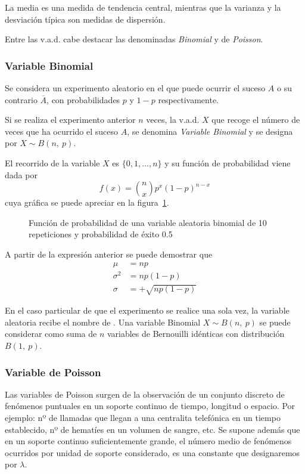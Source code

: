 La media es una medida de tendencia central, mientras que la varianza y la desviación típica son medidas de dispersión.

Entre las v.a.d. cabe destacar las denominadas \emph{Binomial} y de \emph{Poisson}.


\subsubsection{Variable Binomial}

Se considera un experimento aleatorio en el que puede ocurrir el suceso $A$ o su contrario $\overline{A}$, con
probabilidades $p$ y $1-p$ respectivamente.

Si se realiza el experimento anterior $n$ veces, la v.a.d. $X$ que recoge el número de veces que ha ocurrido el suceso
$A$, se denomina \emph{Variable Binomial} y se designa por $X\sim B(n,\ p)$.

El recorrido de la variable $X$ es $\{0,1,...,n\}$ y su función de probabilidad viene dada por 
\[
f(x)= \binom{n}{x} p^x \left( {1 - p} \right)^{n - x} 
\] 
cuya gráfica se puede apreciar en la figura~\ref{g:binomial}.

\begin{figure}[h!]
\centering
\scalebox{0.8}{} 
\caption{Función de probabilidad de una variable aleatoria binomial de 10 repeticiones y probabilidad de éxito 0.5}\label{g:binomial}
\end{figure}

A partir de la expresión anterior se puede demostrar que
\begin{align*}
\mu  &= n p\\
\sigma ^2  &= n p (1 - p)\\
\sigma  &=  + \sqrt {n p (1 - p)}
\end{align*}

En el caso particular de que el experimento se realice una sola vez, la variable aleatoria recibe el nombre de
.
Una variable Binomial $X\sim B(n,\ p)$ se puede considerar como suma de $n$ variables de Bernouilli idénticas con
distribución $B(1,\ p)$.


\subsubsection{Variable de Poisson}
Las variables de Poisson surgen de la observación de un conjunto discreto de fenómenos puntuales en un soporte continuo
de tiempo, longitud o espacio.
Por ejemplo: nº de llamadas que llegan a una centralita telefónica en un tiempo establecido, nº de hematíes en un
volumen de sangre, etc.
Se supone además que en un soporte continuo suficientemente grande, el número medio de fenómenos ocurridos por unidad de
soporte considerado, es una constante que designaremos por $\lambda$.

